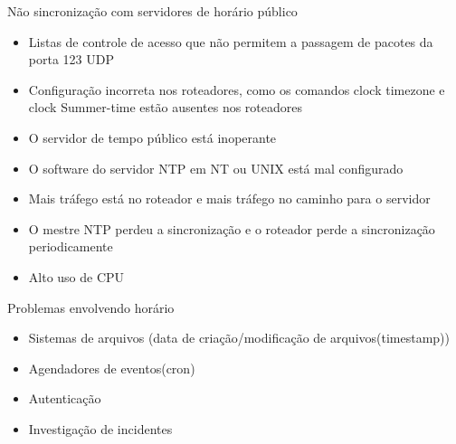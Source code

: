 \documentclass{if-beamer}
\begin{document}
		\begin{frame}{Não sincronização com servidores de horário público}
			\begin{itemize}
			\item Listas de controle de acesso que não permitem a passagem de pacotes da porta 123 UDP
			\item Configuração incorreta nos roteadores, como os comandos clock timezone e clock Summer-time estão ausentes nos roteadores
			\item O servidor de tempo público está inoperante
			\item O software do servidor NTP em NT ou UNIX está mal configurado
			\item Mais tráfego está no roteador e mais tráfego no caminho para o servidor
			\item O mestre NTP perdeu a sincronização e o roteador perde a sincronização periodicamente
			\item Alto uso de CPU
					\end{itemize}
			
		\end{frame}
		\begin{frame}{Problemas envolvendo horário}
					
			\begin{block}{}
				\begin{itemize}
				\item Sistemas de arquivos (data de criação/modificação de arquivos(timestamp))
				\item Agendadores de eventos(cron)
				\item Autenticação
				\item Investigação de incidentes
				\end{itemize}
			\end{block}
		\end{frame}
		
\end{document}
